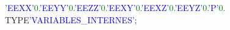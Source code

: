 \textcolor{blue}{'EEXX'}\hspace*{1em}\textcolor{green}{0.}\hspace*{1em}\textcolor{blue}{'EEYY'}\hspace*{1em}\textcolor{green}{0.}\hspace*{1em}\textcolor{blue}{'EEZZ'}\hspace*{1em}\textcolor{green}{0.}\hspace*{1em}\textcolor{blue}{'EEXY'}\hspace*{1em}\textcolor{green}{0.}\hspace*{1em}\textcolor{blue}{'EEXZ'}\hspace*{1em}\textcolor{green}{0.}\hspace*{1em}\textcolor{blue}{'EEYZ'}\hspace*{1em}\textcolor{green}{0.}\hspace*{1em}\textcolor{blue}{'P'}\hspace*{1em}\textcolor{green}{0.}\\
TYPE\hspace*{1em}\textcolor{blue}{'VARIABLES\_INTERNES'};